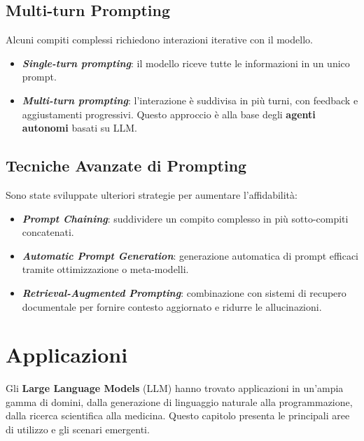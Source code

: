 \subsection{Multi-turn Prompting}
Alcuni compiti complessi richiedono interazioni iterative con il modello.
\begin{itemize}
    \item \textbf{\textit{Single-turn prompting}}: il modello riceve tutte le informazioni in un unico prompt.
    \item \textbf{\textit{Multi-turn prompting}}: l'interazione è suddivisa in più turni, 
    con feedback e aggiustamenti progressivi. Questo approccio è alla base degli \textbf{agenti autonomi} basati su LLM.
\end{itemize}

\subsection{Tecniche Avanzate di Prompting}
Sono state sviluppate ulteriori strategie per aumentare l'affidabilità:
\begin{itemize}
    \item \textbf{\textit{Prompt Chaining}}: suddividere un compito complesso in più sotto-compiti concatenati.
    \item \textbf{\textit{Automatic Prompt Generation}}: generazione automatica di prompt efficaci 
    tramite ottimizzazione o meta-modelli.
    \item \textbf{\textit{Retrieval-Augmented Prompting}}: combinazione con sistemi di recupero documentale 
    per fornire contesto aggiornato e ridurre le allucinazioni.
\end{itemize}

\newpage
\section{Applicazioni}

Gli \textbf{Large Language Models} (LLM) hanno trovato applicazioni in un'ampia gamma di domini, 
dalla generazione di linguaggio naturale alla programmazione, 
dalla ricerca scientifica alla medicina. 
Questo capitolo presenta le principali aree di utilizzo e gli scenari emergenti.

